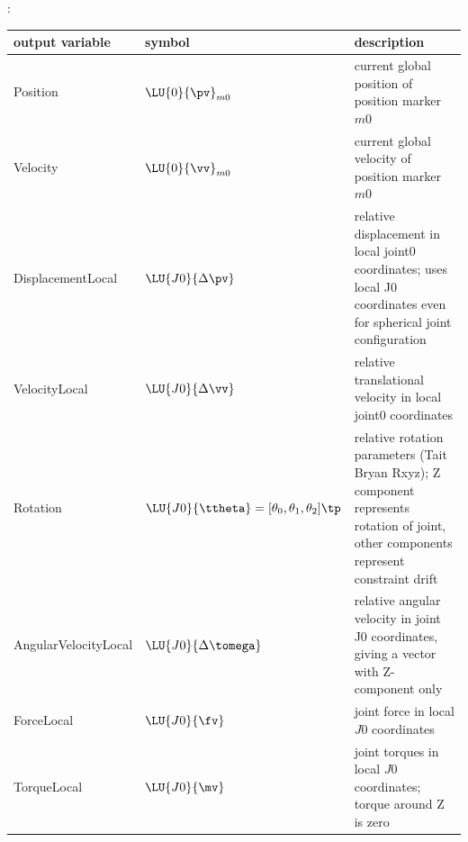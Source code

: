:
\begin{center}
\footnotesize
\begin{longtable}{| p{5cm} | p{5cm} | p{6cm} |} 
\hline
\bf output variable & \bf symbol & \bf description \\ \hline
Position & $\LU{0}{\pv}_{m0}$ & current global position of position marker $m0$\\ \hline
Velocity & $\LU{0}{\vv}_{m0}$ & current global velocity of position marker $m0$\\ \hline
DisplacementLocal & $\LU{J0}{\Delta\pv}$ & relative displacement in local joint0 coordinates; uses local J0 coordinates even for spherical joint configuration\\ \hline
VelocityLocal & $\LU{J0}{\Delta\vv}$ & relative translational velocity in local joint0 coordinates\\ \hline
Rotation & $\LU{J0}{\ttheta}= [\theta_0,\theta_1,\theta_2]\tp$ & relative rotation parameters (Tait Bryan Rxyz); Z component represents rotation of joint, other components represent constraint drift\\ \hline
AngularVelocityLocal & $\LU{J0}{\Delta\tomega}$ & relative angular velocity in joint J0 coordinates, giving a vector with Z-component only\\ \hline
ForceLocal & $\LU{J0}{\fv}$ & joint force in local $J0$ coordinates\\ \hline
TorqueLocal & $\LU{J0}{\mv}$ & joint torques in local $J0$ coordinates; torque around Z is zero\\ \hline
\end{longtable}
\end{center}
 \noindent
